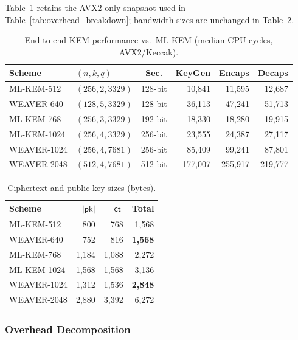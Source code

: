 Table~\ref{tab:kem_avx} retains the AVX2-only snapshot used in
Table~\ref{tab:overhead_breakdown}; bandwidth sizes are unchanged in
Table~\ref{tab:bandwidth}.

\begin{table}[t]
\centering
\caption{End-to-end KEM performance vs.\ ML-KEM (median CPU cycles, AVX2/Keccak).}
\label{tab:kem_avx}
\renewcommand{\arraystretch}{1.15}
\begin{tabular}{llcrrr}
\toprule
\textbf{Scheme} & $(n,k,q)$ & \textbf{Sec.} & \textbf{KeyGen} & \textbf{Encaps} & \textbf{Decaps} \\
\midrule
ML-KEM-512   & $(256,2,3329)$   & 128-bit & 10{,}841 & 11{,}595 & 12{,}687 \\
\textsc{WEAVER-640} & $(128,5,3329)$   & 128-bit & 36{,}113 & 47{,}241 & 51{,}713 \\
\midrule
ML-KEM-768   & $(256,3,3329)$   & 192-bit & 18{,}330 & 18{,}280 & 19{,}915 \\
ML-KEM-1024  & $(256,4,3329)$   & 256-bit & 23{,}555 & 24{,}387 & 27{,}117 \\
\textsc{WEAVER-1024} & $(256,4,7681)$   & 256-bit & 85{,}409 & 99{,}241 & 87{,}801 \\
\midrule
\textsc{WEAVER-2048} & $(512,4,7681)$   & 512-bit & 177{,}007 & 255{,}917 & 219{,}777 \\
\bottomrule
\end{tabular}
\end{table}

\begin{table}[t]
\centering
\caption{Ciphertext and public-key sizes (bytes).}
\label{tab:bandwidth}
\begin{tabular}{lrrr}
\toprule
\textbf{Scheme} & $|\mathsf{pk}|$ & $|\mathsf{ct}|$ & Total \\
\midrule
ML-KEM-512   & 800   & 768   & 1{,}568 \\
\textsc{WEAVER-640}   & 752   & 816   & \textbf{1{,}568} \\
ML-KEM-768   & 1{,}184 & 1{,}088 & 2{,}272 \\
ML-KEM-1024  & 1{,}568 & 1{,}568 & 3{,}136 \\
\textsc{WEAVER-1024}  & 1{,}312 & 1{,}536 & \textbf{2{,}848} \\
\textsc{WEAVER-2048}  & 2{,}880 & 3{,}392 & 6{,}272 \\
\bottomrule
\end{tabular}
\end{table}

\subsubsection{Overhead Decomposition}

